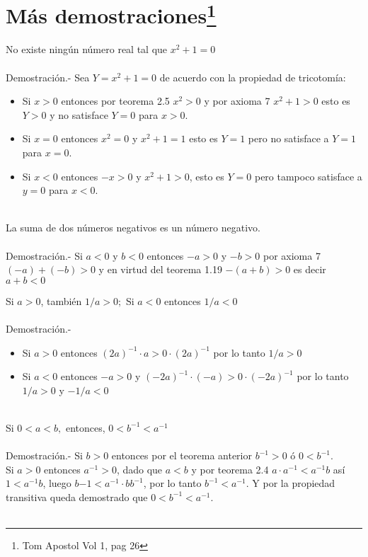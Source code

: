 \section[Más demostraciones]{Más demostraciones\footnote{Tom Apostol Vol 1, pag 26}}   
\begin{teo}
No existe ningún número real tal que $x^2+1=0$\\\\
Demostración.- \; Sea $Y=x^2+1=0$ de acuerdo con la propiedad de tricotomía:
\begin{itemize}
\item Si $x>0$ entonces por teorema 2.5 \; $x^2>0$ y por axioma 7 \; $x^2+1>0$ esto es $Y > 0$ y no satisface $Y=0$ para $x>0$.
\item Si $x=0$ entonces $x^2=0$ y $x^2+1=1$ esto es $Y=1$ pero no satisface a $Y=1$ para $x=0$.
\item Si $x<0$ entonces $-x>0$ y $x^2+1>0$, esto es $Y=0$ pero tampoco satisface a $y=0$ para $x<0$.\\\\ 
\end{itemize}
\end{teo}   
   
\begin{teo}
La suma de dos números negativos es un número negativo.\\\\
Demostración.- \;   Si $a<0$ y $b<0$ entonces $-a>0$ y $-b>0$ por axioma 7 \; $(-a)+(-b)>0$ y en virtud del teorema 1.19 \; $-(a+b)>0$ es decir $a+b<0$\\
\end{teo}   

\begin{teo}
Si $a>0$, también $1/a>0;$ Si $a<0$ entonces $1/a<0$\\\\
Demostración.- \;
\begin{itemize}
\item Si $a>0$ entonces $(2a)^{-1}\cdot a > 0 \cdot (2a)^{-1}$ por lo tanto $1/a>0$
\item Si $a<0$ entonces $-a>0$ y $(-2a)^{-1}\cdot (-a)>0\cdot (-2a)^{-1}$ por lo tanto $1/a>0$ y $-1/a<0$\\\\
\end{itemize}  
\end{teo}

\begin{teo}
Si $0<a<b,$ entonces, $0<b^{-1}<a^{-1}$\\\\
Demostración.- \; Si $b>0$ entonces por el teorema anterior  $b^{-1}>0$ ó $0<b^{-1}$.\\
Si $a>0$ entonces $a^{-1}>0$, dado que $a<b$ y por teorema 2.4 \; $a\cdot a^{-1}< a^{-1}b$ así $1<a^{-1}b$, luego $b{-1}<a^{-1}\cdot bb^{-1}$, por lo tanto $b^{-1}<a^{-1}$. Y por la propiedad transitiva queda demostrado que $0<b^{-1}<a^{-1}$.\\\\
\end{teo}   

